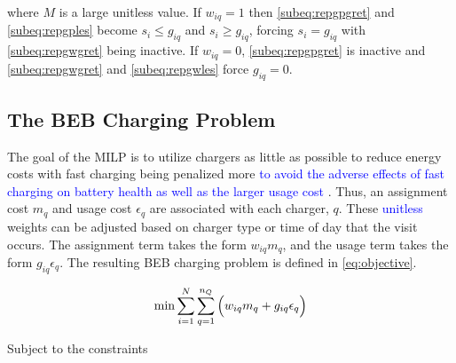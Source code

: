 \documentclass[utf8]{FrontiersinHarvard}
\begin{document}
\noindent where \(M\) is a large unitless value. If \(w_{iq} = 1\) then \autoref{subeq:repgpgret} and
\autoref{subeq:repgples} become \(s_i \leq g_{iq}\) and \(s_i \geq g_{iq}\), forcing \(s_i = g_{iq}\) with \autoref{subeq:repgwgret}
being inactive. If \(w_{iq} = 0\), \autoref{subeq:repgpgret} is inactive and \autoref{subeq:repgwgret} and
\autoref{subeq:repgwles} force \(g_{iq} = 0\).

\subsection{The BEB Charging Problem}
\label{sec:BEB_MILP}
The goal of the MILP is to utilize chargers as little as possible to reduce energy costs with fast charging being
penalized more \textcolor{blue}{to avoid the adverse effects of fast charging on battery health as well as the larger usage cost }. Thus, an assignment cost \(m_q\) and usage cost \(\epsilon_q\) are associated with each charger, \(q\).
These \textcolor{blue}{unitless} weights can be adjusted based on charger type or time of day that the visit
occurs. The assignment term takes the form \(w_{iq}m_q\), and the usage term takes the form \(g_{iq} \epsilon_q\). The
resulting BEB charging problem is defined in \autoref{eq:objective}.

\begin{equation}
\label{eq:objective}
	\min \sum_{i=1}^N \sum_{q=1}^{n_Q} \Big( w_{iq} m_q + g_{iq} \epsilon_q \Big) \\
\end{equation}

Subject to the constraints
\end{document}

